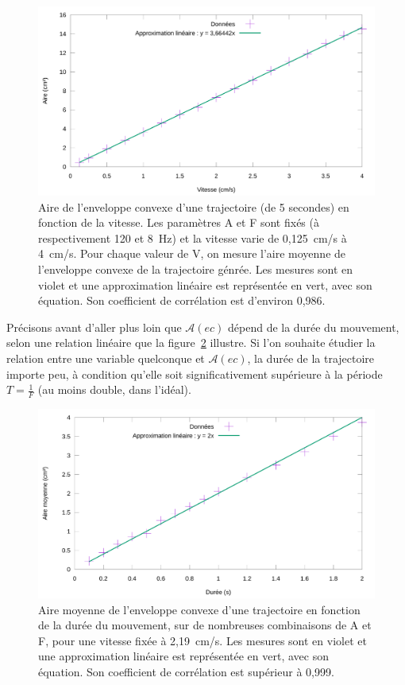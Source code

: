 	\begin{figure}[!htb]
		\centering
		\includegraphics[width=\textwidth]{figures/ch4/areaVspeed}
		\caption[Aire de l'enveloppe convexe en fonction de la vitesse]{Aire de l'enveloppe convexe d'une trajectoire (de 5 secondes) en fonction de la vitesse. Les paramètres A et F sont fixés (à respectivement 120\textdegree{} et 8~Hz) et la vitesse varie de 0,125~cm/s à 4~cm/s. Pour chaque valeur de V, on mesure l'aire moyenne de l'enveloppe convexe de la trajectoire génrée. Les mesures sont en violet et une approximation linéaire est représentée en vert, avec son équation. Son coefficient de corrélation est d'environ 0,986.}
		\label{fig:avspeed}
	\end{figure}
	
	Précisons avant d'aller plus loin que $\mathcal{A}(ec)$ dépend de la durée du mouvement, selon une relation linéaire que la figure~\ref{fig:durationVarea} illustre. Si l'on souhaite étudier la relation entre une variable quelconque et $\mathcal{A}(ec)$, la durée de la trajectoire importe peu, à condition qu'elle soit significativement supérieure à la période $T = \frac{1}{F}$ (au moins double, dans l'idéal).
	
	\begin{figure}[!htb]
		\centering
		\includegraphics[width=\textwidth]{figures/ch4/durationVarea}
		\caption[Aire de l'enveloppe convexe sur en fonction de la durée du mouvement]{Aire moyenne de l'enveloppe convexe d'une trajectoire en fonction de la durée du mouvement, sur de nombreuses combinaisons de A et F, pour une vitesse fixée à 2,19~cm/s. Les mesures sont en violet et une approximation linéaire est représentée en vert, avec son équation. Son coefficient de corrélation est supérieur à 0,999.}
		\label{fig:durationVarea}
	\end{figure}
	
